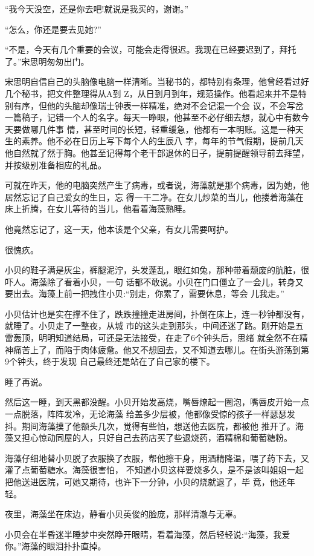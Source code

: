 \documentclass[11pt,a4paper,onecolumn]{article}
\begin{document}
``我今天没空，还是你去吧!就说是我买的，谢谢。''

``怎么，你还是要去见她?''

``不是，今天有几个重要的会议，可能会走得很迟。我现在已经要迟到了，拜托了。''宋思明匆匆出门。

宋思明自信自己的头脑像电脑一样清晰。当秘书的，都特别有条理，他曾经看过好几个秘书，把文件整理得从A到
Z，从日到月到年，规范操作。他看起来并不是特别有序，但他的头脑却像瑞士钟表一样精准，绝对不会记混一个会
议，不会写岔一篇稿子，记错一个人的名字。每天一睁眼，他甚至不必仔细去想，就心中有数今天要做哪几件事
情，甚至时间的长短，轻重缓急，他都有一本明账。这是一种天生的素养。他不必在日历上写下每个人的生辰八
字，每年的节气假期，提前几天他自然就了然于胸。他甚至记得每个老干部退休的日子，提前提醒领导前去拜望，
并按级别准备相应的礼品。

可就在昨天，他的电脑突然产生了病毒，或者说，海藻就是那个病毒，因为她，他居然忘记了自己爱女的生日，忘
得一干二净。在女儿炒菜的当儿，他搂着海藻在床上折腾，在女儿等待的当儿，他看着海藻熟睡。

他竟然忘记了，这一天，他本该是个父亲，有女儿需要呵护。

很愧疚。

小贝的鞋子满是灰尘，裤腿泥泞，头发蓬乱，眼红如兔，那种带着颓废的肮脏，很吓人。海藻除了看着小贝，一句
话都不敢说。小贝在门口僵立了一会儿，转身又要出去。海藻上前一把拽住小贝:``别走，你累了，需要休息，等会
儿我走。''

小贝估计也是实在撑不住了，跌跌撞撞走进房间，扑倒在床上，连一秒钟都没有，就睡了。小贝走了一整夜，从城
市的这头走到那头，中间还迷了路。刚开始是五雷轰顶，明明知道结局，可还是无法接受，在走了6个钟头后，思绪
就全然不在精神痛苦上了，而陷于肉体疲惫。他又不想回去，又不知道去哪儿。在街头游荡到第9个钟头，终于发现
自己最终还是站在了自己家的楼下。

睡了再说。

然后这一睡，到天黑都没醒。小贝开始发高烧，嘴唇燎起一圈泡，嘴唇皮开始一点一点脱落，阵阵发冷，无论海藻
给盖多少层被，他都像受惊的孩子一样瑟瑟发抖。期间海藻摸了他额头几次，觉得有些怕，想送他去医院，都被他
推开了。海藻又担心惊动同屋的人，只好自己去药店买了些退烧药，酒精棉和葡萄糖粉。

海藻仔细地替小贝脱了衣服换了衣服，帮他擦干身，用酒精降温，喂了药下去，又灌了点葡萄糖水。海藻很害怕，
不知道小贝这样要烧多久，是不是该叫姐姐一起把他送进医院，可她又期待，也许下一分钟，小贝的烧就退了，毕
竟，他还年轻。

夜里，海藻坐在床边，静看小贝英俊的脸庞，那样清澈与无辜。

小贝会在半昏迷半睡梦中突然睁开眼睛，看着海藻，然后轻轻说:``海藻，我爱你。''海藻的眼泪扑扑直掉。
\end{document}
